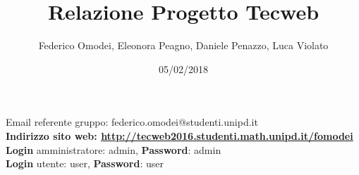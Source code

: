 
\title{\textbf{Relazione Progetto Tecweb}}
\author {Federico Omodei, Eleonora Peagno, Daniele Penazzo, Luca Violato}
\date{05/02/2018}


\begin{titlepage}
\thispagestyle{empty}
\vfill
\maketitle

\vfill

\begin{center}
Email referente gruppo: federico.omodei@studenti.unipd.it\\
\vfill
\textbf{Indirizzo sito web: \url{http://tecweb2016.studenti.math.unipd.it/fomodei}}\\
\textbf{Login} amministratore: admin, \textbf{Password}: admin \\
\textbf{Login} utente: user, \textbf{Password}: user
\vfill
\end{center}
\end{titlepage}

\pagebreak

\tableofcontents

\pagebreak



\pagebreak



\pagebreak



\pagebreak



\pagebreak





